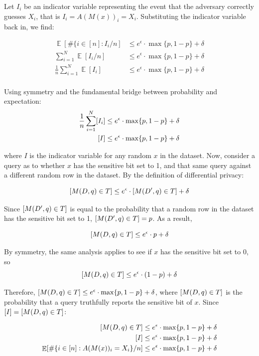 \documentclass[12pt]{article}
\DeclareMathOperator*{\E}{\mathbb{E}}
\let\Pr\relax
\DeclareMathOperator*{\Pr}{\mathbb{P}}
\begin{document}
Let $I_i$ be an indicator variable representing the event that the adversary correctly guesses $X_i$, that is $I_i = A(M(x))_i = X_i$. Substituting the indicator variable back in, we find:

\begin{align*}
\E[\#\{i \in [n]: I_i/n] &\leq e^\epsilon \cdot \max\{p, 1-p\} + \delta \\
\sum_{i=1}^N \E[I_i/n] &\leq e^\epsilon \cdot \max\{p, 1-p\} + \delta \\
\frac{1}{n} \sum_{i=1}^N \E[I_i] &\leq e^\epsilon \cdot \max\{p, 1-p\} + \delta \\
\end{align*}

Using symmetry and the fundamental bridge between probability and expectation:
\begin{align*}
\frac{1}{n} \sum_{i=1}^N \Pr[I_i] &\leq e^\epsilon \cdot \max\{p, 1-p\} + \delta \\
\Pr[I] &\leq e^\epsilon \cdot \max\{p, 1-p\} + \delta \\
\end{align*}

where $I$ is the indicator variable for any random $x$ in the dataset. Now, consider a query as to whether $x$ has the sensitive bit set to 1, and that same query against a different random row in the dataset. By the definition of differential privacy:

$$\Pr[M(D, q) \in T] \leq e^\epsilon \cdot \Pr[M(D', q) \in T] + \delta$$

Since $\Pr[M(D', q) \in T]$ is equal to the probability that a random row in the dataset has the sensitive bit set to 1, $\Pr[M(D', q) \in T] = p$. As a result,

$$\Pr[M(D, q) \in T] \leq e^\epsilon \cdot p + \delta$$

\bigskip

By symmetry, the same analysis applies to see if $x$ has the sensitive bit set to 0, so $$\Pr[M(D, q) \in T] \leq e^\epsilon \cdot (1-p) + \delta$$

Therefore, $\Pr[M(D, q) \in T] \leq e^\epsilon \cdot \max\{p, 1-p\} + \delta$, where $\Pr[M(D, q) \in T]$ is the probability that a query truthfully reports the sensitive bit of $x$. Since $\Pr[I] = \Pr[M(D, q) \in T]$:

\begin{align*}
\Pr[M(D, q) \in T] &\leq e^\epsilon \cdot \max\{p, 1-p\} + \delta \\
\Pr[I] &\leq e^\epsilon \cdot \max\{p, 1-p\} + \delta \\
\E[\#\{i \in [n]: A(M(x))_i = X_i\}/n] &\leq e^\epsilon \cdot \max\{p, 1-p\} + \delta \\
\end{align*}
\end{document}
